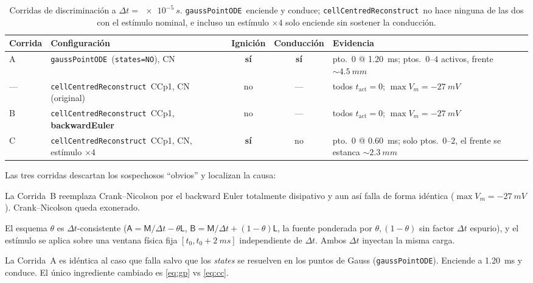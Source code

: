 \documentclass[11pt,a4paper]{article}
\newcommand{\Vm}{V_{m}}
\newcommand{\code}[1]{\texttt{\small #1}}
\newcommand{\gpode}{\code{gaussPointODE}}
\newcommand{\ccrec}{\code{cellCentredReconstruct}}
\begin{document}
\begin{table}[h]
\centering
\footnotesize
\begin{tabular}{@{}l l c c p{5.2cm}@{}}
\toprule
Corrida & Configuración & Ignición & Conducción & Evidencia \\
\midrule
A & \gpode\ (\code{states=NO}), CN            & \textbf{sí} & \textbf{sí}
  & pto.\ $0$ @ \SI{1.20}{ms}; ptos.\ $0$--$4$ activos, frente ${\sim}\SI{4.5}{mm}$ \\
--- & \ccrec\ CCp1, CN (original)             & no  & ---
  & todos $t_{\mathrm{act}}=0$; $\max \Vm=\SI{-27}{mV}$ \\
B & \ccrec\ CCp1, \textbf{backwardEuler}      & no  & ---
  & todos $t_{\mathrm{act}}=0$; $\max \Vm=\SI{-27}{mV}$ \\
C & \ccrec\ CCp1, CN, estímulo $\times 4$     & \textbf{sí} & no
  & pto.\ $0$ @ \SI{0.60}{ms}; solo ptos.\ $0$--$2$, el frente se estanca ${\sim}\SI{2.3}{mm}$ \\
\bottomrule
\end{tabular}
\caption{Corridas de discriminación a $\Delta t=\SI{e-5}{s}$. \gpode\ enciende y
conduce; \ccrec\ no hace ninguna de las dos con el estímulo nominal, e incluso un
estímulo $\times 4$ solo enciende sin sostener la conducción.}
\label{tab:disc}
\end{table}

\noindent Las tres corridas descartan los sospechosos ``obvios'' y localizan la causa:
\begin{description}[style=nextline,leftmargin=1.2em,nosep]
  \item[No es el esquema temporal.] La Corrida~B reemplaza Crank--Nicolson por el
    backward Euler totalmente disipativo y aun así falla de forma idéntica
    ($\max\Vm=\SI{-27}{mV}$). Crank--Nicolson queda exonerado.
  \item[No es un error de escala en $\Delta t$.] El esquema $\theta$ es
    $\Delta t$-consistente
    ($\mathsf{A}=\mathsf{M}/\Delta t-\theta\mathsf{L}$,
    $\mathsf{B}=\mathsf{M}/\Delta t+(1-\theta)\mathsf{L}$, la fuente ponderada por
    $\theta,(1-\theta)$ sin factor $\Delta t$ espurio), y el estímulo se aplica
    sobre una ventana física fija $[t_0,t_0+\SI{2}{ms}]$ independiente de
    $\Delta t$. Ambos $\Delta t$ inyectan la misma carga.
  \item[\emph{Sí} es el modo de \emph{states}.] La Corrida~A es idéntica al caso
    que falla salvo que los \emph{states} se resuelven en los puntos de Gauss
    (\gpode). Enciende a \SI{1.20}{ms} y conduce. El único ingrediente cambiado es
    \eqref{eq:gp} vs \eqref{eq:cc}.
\end{description}
\end{document}
